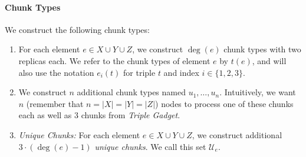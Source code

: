 \documentclass[preprint,12pt]{elsarticle}
\newcommand{\TripleGadget}{{\emph{Triple Gadget}}}
\newcommand{\UniqueE}{{\ensuremath{\mathcal{U}_e}}}
\begin{document}
\paragraph{Chunk Types}
We construct the following chunk types:
\begin{enumerate}
  \item For each element $e\in X\cup Y\cup Z$, we construct $\deg(e)$
  chunk types with two replicas each.  We refer to the chunk types of
  element $e$ by $t(e)$, and will also use the notation $e_i(t)$ for
  triple $t$ and index $i \in \{1,2,3\}$.
  \item We construct $n$ additional chunk types named
  $u_1, \ldots, u_n$.  Intuitively, we want $n$ (remember that
  $n=|X|=|Y|=|Z|$) nodes to process one of these chunks each as well
  as $3$ chunks from \TripleGadget.
  \item \emph{Unique Chunks:} For each element $e\in X\cup Y\cup Z$,
  we construct additional $3\cdot(\deg(e) - 1)$ \emph{unique chunks}.
  We call this set $\UniqueE$.
\end{enumerate}
\end{document}
